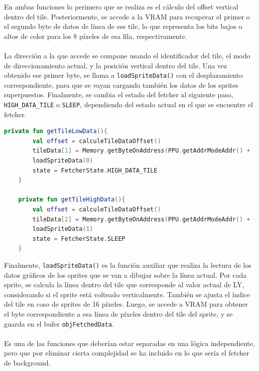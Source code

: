 En ambas funciones lo perimero que se realiza es el cálculo del offset vertical dentro del tile. Posteriormente, se accede a la VRAM para recuperar el primer o el segundo byte de datos de línea de ese tile, lo que representa los bits bajos o altos de color para los 8 píxeles de esa fila, respectivamente.
\\\\
La dirección a la que accede se compone usando el identificador del tile, el modo de direccionamiento actual, y la posición vertical dentro del tile. Una vez obtenido ese primer byte, se llama a \texttt{loadSpriteData()} con el desplazamiento correspondiente, para que se vayan cargando también los datos de los sprites superpuestos. Finalmente, se cambia el estado del fetcher al siguiente paso, \texttt{HIGH\_DATA\_TILE} o \texttt{SLEEP}, dependiendo del estado actual en el que se encuentre el fetcher.

\begin{lstlisting}[language=Kotlin, caption={FIFO Fetcher - Obtención de los Bits Bajos o Altos del Tile.}, label={code:ppufifogethighlowdata}]
    private fun getTileLowData(){
        val offset = calculeTileDataOffset()
        tileData[1] = Memory.getByteOnAddress(PPU.getAddrModeAddr() + ((tileData[0].toInt() and 0xFF) * 16) + offset)
        loadSpriteData(0)
        state = FetcherState.HIGH_DATA_TILE
    }

    private fun getTileHighData(){
        val offset = calculeTileDataOffset()
        tileData[2] = Memory.getByteOnAddress(PPU.getAddrModeAddr() + ((tileData[0].toInt() and 0xFF) * 16) + (offset + 1))
        loadSpriteData(1)
        state = FetcherState.SLEEP
    }
\end{lstlisting}

Finalmente, \texttt{loadSpriteData()} es la función auxiliar que realiza la lectura de los datos gráficos de los sprites que se van a dibujar sobre la línea actual. Por cada sprite, se calcula la línea dentro del tile que corresponde al valor actual de LY, considerando si el sprite está volteado verticalmente. También se ajusta el índice del tile en caso de sprites de 16 píxeles. Luego, se accede a VRAM para obtener el byte correspondiente a esa línea de píxeles dentro del tile del sprite, y se guarda en el bufer \texttt{objFetchedData}.
\\\\
Es una de las funciones que deberían estar separadas en una lógica independiente, pero que por eliminar cierta complejidad se ha incluido en lo que sería el fetcher de background.

